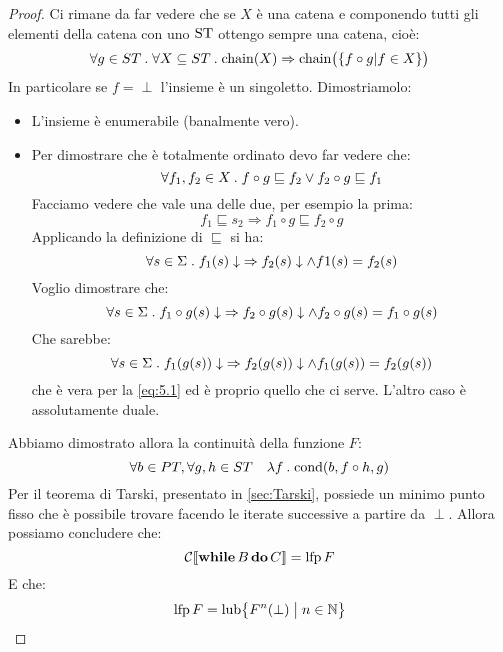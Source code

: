 \begin{proof}
Ci rimane da far vedere che se $X$ è una catena e
componendo tutti gli elementi della catena con uno $\mathrm{ST}$
ottengo sempre una catena, cioè:
\[
  \forall g \in ST \mathrel{.} \forall X \subseteq ST
  \mathrel{.} \mathop{\mathrm{chain}}\nolimits(X) \Rightarrow \mathop{\mathrm{chain}}\nolimits\bigl(\{ f \circ g | f \in X \} \bigr)
\]
In particolare se $f = \perp$ l'insieme è un singoletto.
Dimostriamolo:
\begin{itemize}
  \item L'insieme è enumerabile (banalmente vero).
  \item Per dimostrare che è totalmente ordinato devo far vedere che:
  \[
    \forall f_1 , f_2 \in X \mathrel{.} f \circ g \sqsubseteq f_2 \lor f_2
    \circ g \sqsubseteq f_1
  \]
  Facciamo vedere che vale una delle due, per esempio la prima:
  \[ f_1 \sqsubseteq s_2 \Rightarrow f_1 \circ g \sqsubseteq f_2 \circ g \]
  Applicando la definizione di $ \sqsubseteq $ si ha:
  \begin{equation}
    \forall s \in \Sigma \mathrel{.} f_{1}(s) \downarrow \; \Rightarrow f_{2}(s) \downarrow
    \land f{1}(s)=f_{2}(s)
    \label{eq:5.1}
  \end{equation}
   Voglio dimostrare che:
   \[
     \forall s \in \Sigma \mathrel{.} f_1 \circ g(s) \downarrow
     \; \Rightarrow f_2 \circ g(s) \downarrow \land f_2
     \circ g(s) = f_1 \circ g(s)
    \]
    Che sarebbe:
    \[
      \forall s \in \Sigma \mathrel{.} f_{1}(g(s)) \downarrow
      \; \Rightarrow f_{2}(g(s)) \downarrow \land f_{1}(g(s))
      = f_{2}(g(s))
    \]
    che è vera per la \ref{eq:5.1} ed è proprio quello che ci serve.
    L'altro caso è assolutamente duale.
\end{itemize}
Abbiamo dimostrato allora la continuità della funzione $F$:
\[
  \forall b \in PT, \forall g,h \in ST \quad \lambda f \mathrel{.} \mathrm{cond}(b,f \circ h,g)
\]
Per il teorema di Tarski, presentato in \autoref{sec:Tarski},
possiede un minimo punto fisso che è possibile trovare
facendo le iterate successive a partire da $\perp$.
Allora possiamo concludere che:
\[ \mathcal{C} \llbracket \mathop{\textup{\textbf{while}}} B \mathop{\textup{\textbf{do}}} C \rrbracket = \mathop{\mathrm{lfp}}\nolimits F \]
E che:
\[ \mathop{\mathrm{lfp}}\nolimits F = \mathop{\mathrm{lub}}\nolimits \bigl\{ F^n(\perp ) \bigm| n \in \mathbb{N} \bigr\} \]
\end{proof}

